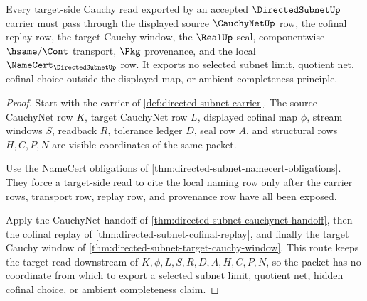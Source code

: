 \begin{theorem}
\label{thm:directed-subnet-target-filter-nonescape}
Every target-side Cauchy read exported by an accepted $\DirectedSubnetUp$ carrier must pass through the displayed source $\CauchyNetUp$ row, the cofinal replay row, the target Cauchy window, the $\RealUp$ seal, componentwise $\hsame/\Cont$ transport, $\Pkg$ provenance, and the local $\NameCert_{\DirectedSubnetUp}$ row. It exports no selected subnet limit, quotient net, cofinal choice outside the displayed map, or ambient completeness principle.
\end{theorem}
\begin{proof}
Start with the carrier of \autoref{def:directed-subnet-carrier}. The source CauchyNet row $K$, target CauchyNet row $L$, displayed cofinal map $\phi$, stream windows $S$, readback $R$, tolerance ledger $D$, seal row $A$, and structural rows $H,C,P,N$ are visible coordinates of the same packet.

Use the NameCert obligations of \autoref{thm:directed-subnet-namecert-obligations}. They force a target-side read to cite the local naming row only after the carrier rows, transport row, replay row, and provenance row have all been exposed.

Apply the CauchyNet handoff of \autoref{thm:directed-subnet-cauchynet-handoff}, then the cofinal replay of \autoref{thm:directed-subnet-cofinal-replay}, and finally the target Cauchy window of \autoref{thm:directed-subnet-target-cauchy-window}. This route keeps the target read downstream of $K,\phi,L,S,R,D,A,H,C,P,N$, so the packet has no coordinate from which to export a selected subnet limit, quotient net, hidden cofinal choice, or ambient completeness claim.
\end{proof}

